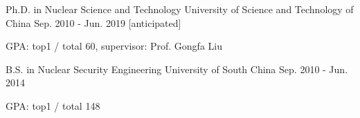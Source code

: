 

\begin{cventries}

\cventry
{Ph.D. in Nuclear Science and Technology} %
{University of Science and Technology of China} %
{} %
{Sep. 2010 - Jun. 2019 [anticipated]} %
{
	\begin{cvitems} %
		\item {GPA: top1 / total 60, supervisor: Prof. Gongfa Liu}
	\end{cvitems}
}

  \cventry
    {B.S. in Nuclear Security Engineering} %
    {University of South China} %
    {} %
    {Sep. 2010 - Jun. 2014} %
    {
      \begin{cvitems} %
        \item {GPA: top1 / total 148}
      \end{cvitems}
    }

\end{cventries}
